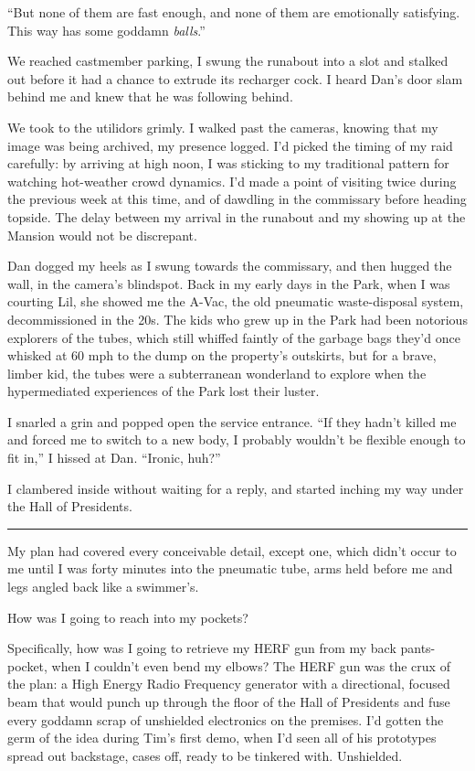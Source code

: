“But none of them are fast enough, and none of them are emotionally
satisfying. This way has some goddamn \emph{balls}.”

We reached castmember parking, I swung the runabout into a slot and
stalked out before it had a chance to extrude its recharger cock. I
heard Dan's door slam behind me and knew that he was following
behind.

We took to the utilidors grimly. I walked past the cameras, knowing
that my image was being archived, my presence logged. I'd picked
the timing of my raid carefully: by arriving at high noon, I was
sticking to my traditional pattern for watching hot-weather crowd
dynamics. I'd made a point of visiting twice during the previous
week at this time, and of dawdling in the commissary before heading
topside. The delay between my arrival in the runabout and my
showing up at the Mansion would not be discrepant.

Dan dogged my heels as I swung towards the commissary, and then
hugged the wall, in the camera's blindspot. Back in my early days
in the Park, when I was courting Lil, she showed me the A-Vac, the
old pneumatic waste-disposal system, decommissioned in the 20s. The
kids who grew up in the Park had been notorious explorers of the
tubes, which still whiffed faintly of the garbage bags they'd once
whisked at 60 mph to the dump on the property's outskirts, but for
a brave, limber kid, the tubes were a subterranean wonderland to
explore when the hypermediated experiences of the Park lost their
luster.

I snarled a grin and popped open the service entrance. “If they
hadn't killed me and forced me to switch to a new body, I probably
wouldn't be flexible enough to fit in,” I hissed at Dan. “Ironic,
huh?”

I clambered inside without waiting for a reply, and started inching
my way under the Hall of Presidents.

\begin{center}\rule{1in}{0.4pt}\end{center}

My plan had covered every conceivable detail, except one, which
didn't occur to me until I was forty minutes into the pneumatic
tube, arms held before me and legs angled back like a swimmer's.

How was I going to reach into my pockets?

Specifically, how was I going to retrieve my HERF gun from my back
pants-pocket, when I couldn't even bend my elbows? The HERF gun was
the crux of the plan: a High Energy Radio Frequency generator with
a directional, focused beam that would punch up through the floor
of the Hall of Presidents and fuse every goddamn scrap of
unshielded electronics on the premises. I'd gotten the germ of the
idea during Tim's first demo, when I'd seen all of his prototypes
spread out backstage, cases off, ready to be tinkered with.
Unshielded.

